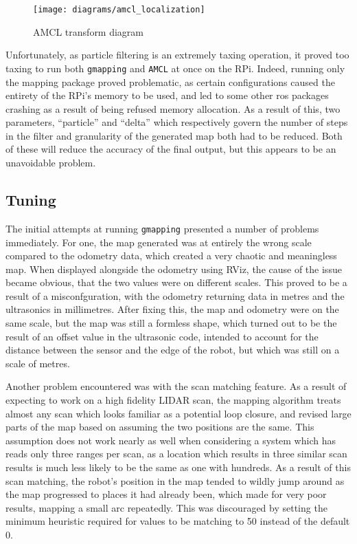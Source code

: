 \begin{figure}[!ht]
	\centering
	\texttt{[image: diagrams/amcl\_localization]}
	\caption{AMCL transform diagram~\cite{macenski_amcl}}\label{fig:amcl}
\end{figure}

Unfortunately, as particle filtering is an extremely taxing operation, it proved too taxing to run both
\verb|gmapping| and \verb|AMCL| at once on the RPi. Indeed, running only the mapping package proved problematic,
as certain configurations caused the entirety of the RPi's memory to be used, and led to some other ros packages
crashing as a result of being refused memory allocation. As a result of this, two parameters, ``particle'' and
``delta'' which respectively govern the number of steps in the filter and granularity of the generated map both
had to be reduced. Both of these will reduce the accuracy of the final output, but this appears to be an unavoidable problem.

\subsection{Tuning}\label{soft/SLAM/tuning}

The initial attempts at running \verb|gmapping| presented a number of problems immediately. For one, the map
generated was at entirely the wrong scale compared to the odometry data, which created a very chaotic and meaningless
map. When displayed alongside the odometry using RViz, the cause of the issue became obvious, that the two values were
on different scales. This proved to be a result of a misconfguration, with the odometry returning data in metres and
the ultrasonics in millimetres. After fixing this, the map and odometry were on the same scale, but the map was still
a formless shape, which turned out to be the result of an offset value in the ultrasonic code, intended to account
for the distance between the sensor and the edge of the robot, but which was still on a scale of metres. 

Another problem encountered was with the scan matching feature. As a result of expecting to work on a high fidelity
LIDAR scan, the mapping algorithm treats almost any scan which looks familiar as a potential loop closure, and revised
large parts of the map based on assuming the two positions are the same. This assumption does not work nearly as well
when considering a system which has reads only three ranges per scan, as a location which results in three similar
scan results is much less likely to be the same as one with hundreds. As a result of this scan matching, the robot's
position in the map tended to wildly jump around as the map progressed to places it had already been, which made for
very poor results, mapping a small arc repeatedly. This was discouraged by setting the minimum heuristic required for
values to be matching to 50 instead of the default 0.

